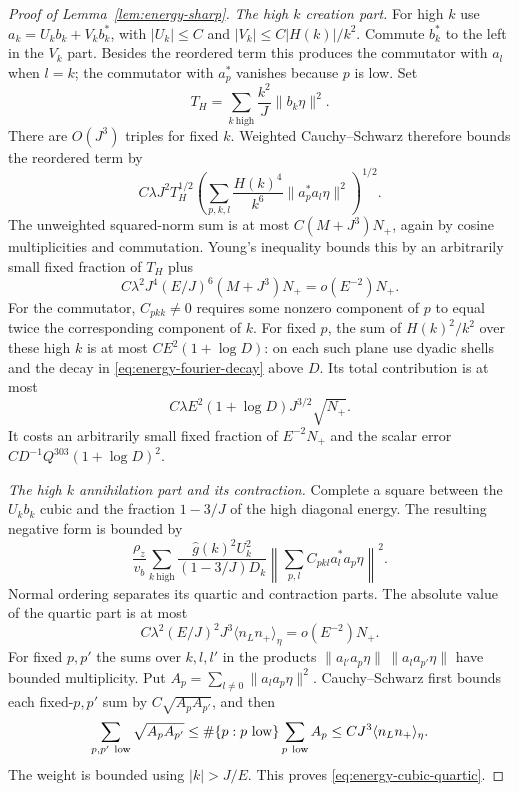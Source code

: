 \begin{proof}[Proof of Lemma~\ref{lem:energy-sharp}]
\emph{The high $k$ creation part.}
For high $k$ use $a_k=U_kb_k+V_kb_k^*$, with
$|U_k|\le C$ and $|V_k|\le C|H(k)|/k^2$.
Commute $b_k^*$ to the left in the $V_k$ part.  Besides the reordered
term this produces the commutator with $a_l$ when $l=k$; the
commutator with $a_p^*$ vanishes because $p$ is low.  Set
\[
 T_H=\sum_{k\ \text{high}}\frac{k^2}{J}\|b_k\eta\|^2.
\]
There are $O(J^3)$ triples for fixed $k$.  Weighted Cauchy--Schwarz
therefore bounds the reordered term by
\[
 C\lambda J^2 T_H^{1/2}
       \left(\sum_{p,k,l}\frac{H(k)^4}{k^6}
                                \|a_p^*a_l\eta\|^2\right)^{1/2}.
\]
The unweighted squared-norm sum is at most
$C(M+J^3)N_+$, again by cosine multiplicities and commutation.
Young's inequality bounds this by an arbitrarily small fixed fraction
of $T_H$ plus
\begin{equation}\label{eq:energy-high-creation-error}
 C\lambda^2J^4(E/J)^6(M+J^3)N_+=o(E^{-2})N_+.
\end{equation}
For the commutator, $C_{pkk}\ne0$ requires some nonzero component of
$p$ to equal twice the corresponding component of $k$.
For fixed $p$, the sum of $H(k)^2/k^2$ over these high $k$ is at most
$CE^2(1+\log D)$: on each such plane use dyadic shells and the decay
in \eqref{eq:energy-fourier-decay} above $D$.
Its total contribution is at most
\[
 C\lambda E^2(1+\log D)J^{3/2}\sqrt{N_+}.
\]
It costs an arbitrarily small fixed fraction of $E^{-2}N_+$ and the
scalar error $CD^{-1}Q^{303}(1+\log D)^2$.

\emph{The high $k$ annihilation part and its contraction.}
Complete a square between the $U_kb_k$ cubic and the fraction $1-3/J$
of the high diagonal energy.  The resulting negative form is bounded by
\begin{equation}\label{eq:energy-cubic-square}
 \frac{\rho_z}{v_b}\sum_{k\ \text{high}}
  \frac{\widehat g(k)^2U_k^2}{(1-3/J)D_k}
       \left\|\sum_{p,l}C_{pkl}a_l^*a_p\eta\right\|^2.
\end{equation}
Normal ordering separates its quartic and contraction parts.
The absolute value of the quartic part is at most
\begin{equation}\label{eq:energy-cubic-quartic}
 C\lambda^2(E/J)^2J^3\langle n_Ln_+\rangle_\eta
                                      =o(E^{-2})N_+.
\end{equation}
For fixed $p,p'$ the sums over $k,l,l'$ in the products
$\|a_{l'}a_p\eta\|\,\|a_la_{p'}\eta\|$ have bounded multiplicity.
Put $A_p=\sum_{l\ne0}\|a_la_p\eta\|^2$.  Cauchy--Schwarz first
bounds each fixed-$p,p'$ sum by $C\sqrt{A_pA_{p'}}$, and then
\[
 \sum_{p,p'\ {\rm low}}\sqrt{A_pA_{p'}}
 \le \#\{p:p\ {\rm low}\}\sum_{p\ {\rm low}}A_p
 \le CJ^3\langle n_Ln_+\rangle_\eta .
\]
The weight is bounded using $|k|>J/E$.  This proves
\eqref{eq:energy-cubic-quartic}.


\end{proof}
